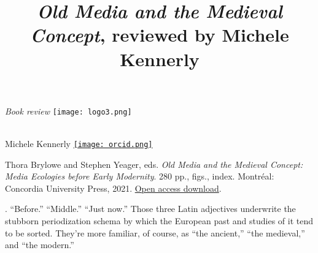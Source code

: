 \documentclass{tufte-handout}
\title[Review of Brylowe \& Yeager]{\emph{Old Media and the Medieval Concept}, reviewed by Michele Kennerly} %
\begin{document}
\begin{titlepage}

\begin{fullwidth}
\noindent\LARGE\emph{Book review
} \hspace{88mm}\texttt{[image: logo3.png]}\\
\noindent\hrulefill\\
\vspace*{1em}

\vspace*{1.5em}

\noindent\LARGE{Michele Kennerly} \href{https://orcid.org/0000-0001-8674-338X}{\texttt{[image: orcid.png]}}\par{}
\vspace*{0.5em}
 



\end{fullwidth}

\vspace*{1em}


    
\noindent\small{Thora Brylowe and Stephen Yeager, eds. \emph{Old Media and the Medieval
Concept: Media Ecologies before Early Modernity}. 280 pp., figs., index.
Montréal: Concordia University Press, 2021.
\href{https://press.library.concordia.ca/projects/old-media-and-the-medieval-concept}{Open access download}.}

\vspace*{0.25em}

. ``Before.'' ``Middle.''
``Just now.'' Those three Latin adjectives underwrite the stubborn
periodization schema by which the European past and studies of it tend
to be sorted. They're more familiar, of course, as ``the ancient,''
``the medieval,'' and ``the modern.''


\end{titlepage}
\end{document}
